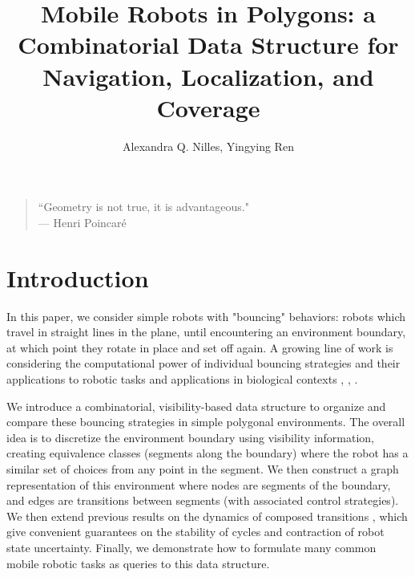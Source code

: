 \documentclass[letterpaper, 10 pt, conference]{ieeeconf}  %
\title{Mobile Robots in Polygons: a Combinatorial Data Structure for
Navigation, Localization, and Coverage}
\author{Alexandra Q. Nilles, Yingying Ren%
}
\begin{document}
\maketitle

%

{\small
\begin{center}
\begin{quotation}
``Geometry is not true, it is advantageous." \\
\hfill    --- Henri Poincar\'e
\end{quotation}
\end{center}
}

\section{Introduction} 
In this paper, we consider simple robots with "bouncing" behaviors: robots which travel in straight lines in the plane, until encountering an environment boundary, at which point they rotate in place and set off again. A growing line of work is considering the computational power of individual bouncing strategies and their applications to robotic tasks and applications in biological contexts \cite{erickson2013toward}, \cite{microorg}, \cite{alam2017minimalist}. 

We introduce a combinatorial, visibility-based data structure to organize and compare these bouncing strategies in simple polygonal environments. The overall idea is to discretize the environment boundary using visibility information, creating equivalence classes (segments along the boundary) where the robot has a similar set of choices from any point in the segment. We then construct a graph representation of this environment where nodes are segments of the boundary, and edges are transitions between segments (with associated control strategies). We then extend previous results on the dynamics of composed transitions \cite{nilles2017periodic}, which give convenient guarantees on the stability of cycles and contraction of robot state uncertainty. Finally, we demonstrate how to formulate many common mobile robotic tasks as queries to this data structure.
\end{document}
